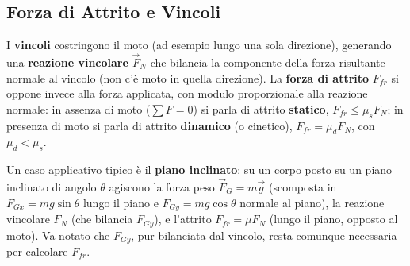 \documentclass[a4paper,11pt]{article}
\begin{document}
\subsection{Forza di Attrito e Vincoli}

I \textbf{vincoli} costringono il moto (ad esempio lungo una sola direzione), generando una \textbf{reazione vincolare} $\vec F_N$ che bilancia la componente della forza risultante normale al vincolo (non c'è moto in quella direzione). La \textbf{forza di attrito} $F_{fr}$ si oppone invece alla forza applicata, con modulo proporzionale alla reazione normale: in assenza di moto ($\sum F=0$) si parla di attrito \textbf{statico}, $F_{fr}\leq\mu_sF_N$; in presenza di moto si parla di attrito \textbf{dinamico} (o cinetico), $F_{fr}=\mu_dF_N$, con $\mu_d<\mu_s$.

\begin{center}
\end{center}

Un caso applicativo tipico è il \textbf{piano inclinato}: su un corpo posto su un piano inclinato di angolo $\theta$ agiscono la forza peso $\vec F_G=m\vec g$ (scomposta in $F_{Gx}=mg\sin\theta$ lungo il piano e $F_{Gy}=mg\cos\theta$ normale al piano), la reazione vincolare $F_N$ (che bilancia $F_{Gy}$), e l'attrito $F_{fr}=\mu F_N$ (lungo il piano, opposto al moto). Va notato che $F_{Gy}$, pur bilanciata dal vincolo, resta comunque necessaria per calcolare $F_{fr}$.
\end{document}
